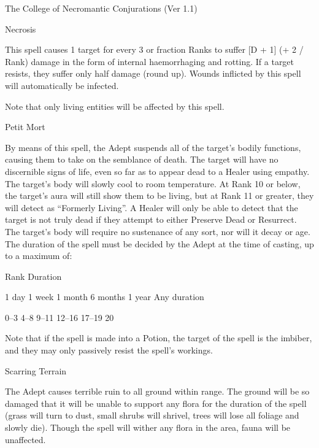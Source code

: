 \begin{Chapter}{The College of Necromantic Conjurations (Ver 1.1)}
\begin{spell}[S-9]{Necrosis}
\begin{effects}
This spell causes 1 target for every 3 or fraction Ranks to suffer [D
  + 1] (+ 2 / Rank) damage in the form of internal haemorrhaging and
rotting.  If a target resists, they suffer only half damage (round
up). Wounds inflicted by this spell will automatically be infected.

Note that only living entities will be affected by this spell.
\end{effects}
\end{spell}

\begin{spell}[S-10]{Petit Mort}

\begin{effects}
By means of this spell, the Adept suspends all of the target’s bodily
functions, causing them to take on the semblance of death.  The target
will have no discernible signs of life, even so far as to appear dead
to a Healer using empathy.  The target’s body will slowly cool to room
temperature.  At Rank 10 or below, the target’s aura will still show
them to be living, but at Rank 11 or greater, they will detect as
“Formerly Living”.  A Healer will only be able to detect that the
target is not truly dead if they attempt to either Preserve Dead or
Resurrect.  The target’s body will require no sustenance of any sort,
nor will it decay or age. The duration of the spell must be decided by
the Adept at the time of casting, up to a maximum of:

Rank  Duration 

1 day 
1 week 
1 month 
6 months 
1 year 
Any duration 

0–3 
4–8 
9–11 
12–16 
17–19 
20 

Note that if the spell is made into a Potion, the target of the spell
is the imbiber, and they may only passively resist the spell’s
workings.
\end{effects}
\end{spell}

\begin{spell}[S-11]{Scarring Terrain}

\begin{effects}
The Adept causes terrible ruin to all ground within range.  The ground
will be so damaged that it will be unable to support any flora for the
duration of the spell (grass will turn to dust, small shrubs will
shrivel, trees will lose all foliage and slowly die).  Though the
spell will wither any flora in the area, fauna will be unaffected.
\end{effects}
\end{spell}


\end{Chapter}
